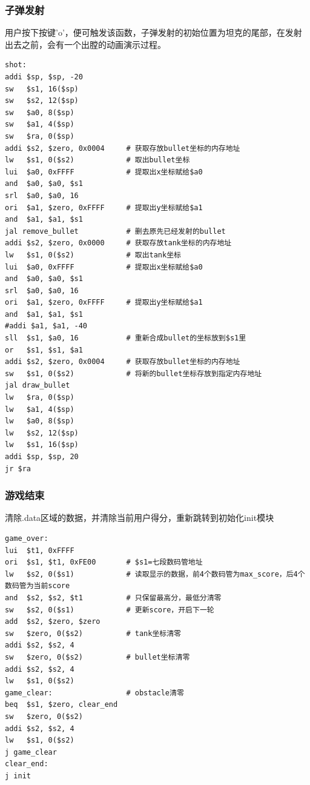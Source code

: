 \subsubsection{子弹发射}
用户按下按键'o'，便可触发该函数，子弹发射的初始位置为坦克的尾部，在发射出去之前，会有一个出膛的动画演示过程。\\

\begin{lstlisting}[frame=shadowbox]
shot:
addi $sp, $sp, -20
sw   $s1, 16($sp)
sw   $s2, 12($sp)
sw   $a0, 8($sp)
sw   $a1, 4($sp)
sw   $ra, 0($sp)
addi $s2, $zero, 0x0004     # 获取存放bullet坐标的内存地址
lw   $s1, 0($s2)            # 取出bullet坐标
lui  $a0, 0xFFFF            # 提取出x坐标赋给$a0
and  $a0, $a0, $s1
srl  $a0, $a0, 16
ori  $a1, $zero, 0xFFFF     # 提取出y坐标赋给$a1
and  $a1, $a1, $s1
jal remove_bullet           # 删去原先已经发射的bullet
addi $s2, $zero, 0x0000     # 获取存放tank坐标的内存地址
lw   $s1, 0($s2)            # 取出tank坐标
lui  $a0, 0xFFFF            # 提取出x坐标赋给$a0
and  $a0, $a0, $s1
srl  $a0, $a0, 16
ori  $a1, $zero, 0xFFFF     # 提取出y坐标赋给$a1
and  $a1, $a1, $s1
#addi $a1, $a1, -40
sll  $s1, $a0, 16           # 重新合成bullet的坐标放到$s1里
or   $s1, $s1, $a1
addi $s2, $zero, 0x0004     # 获取存放bullet坐标的内存地址
sw   $s1, 0($s2)            # 将新的bullet坐标存放到指定内存地址
jal draw_bullet
lw   $ra, 0($sp)
lw   $a1, 4($sp)
lw   $a0, 8($sp)
lw   $s2, 12($sp)
lw   $s1, 16($sp)
addi $sp, $sp, 20
jr $ra

\end{lstlisting}

\subsubsection{游戏结束}
清除.data区域的数据，并清除当前用户得分，重新跳转到初始化init模块\\

\begin{lstlisting}[frame=shadowbox]
game_over:
lui  $t1, 0xFFFF
ori  $s1, $t1, 0xFE00       # $s1=七段数码管地址
lw   $s2, 0($s1)            # 读取显示的数据，前4个数码管为max_score，后4个数码管为当前score
and  $s2, $s2, $t1          # 只保留最高分，最低分清零
sw   $s2, 0($s1)            # 更新score，开启下一轮
add  $s2, $zero, $zero
sw   $zero, 0($s2)          # tank坐标清零
addi $s2, $s2, 4 
sw   $zero, 0($s2)          # bullet坐标清零
addi $s2, $s2, 4
lw   $s1, 0($s2)
game_clear:                 # obstacle清零
beq  $s1, $zero, clear_end
sw   $zero, 0($s2)
addi $s2, $s2, 4
lw   $s1, 0($s2)
j game_clear
clear_end:
j init
\end{lstlisting}

